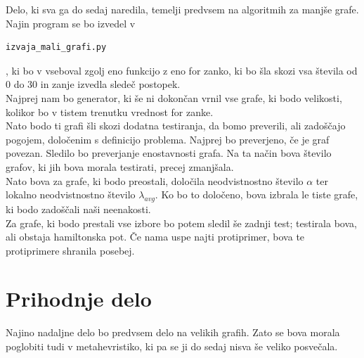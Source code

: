 \documentclass[12pt,a4paper]{amsart}
\begin{document}
Delo, ki sva ga do sedaj naredila, temelji predvsem na algoritmih za manjše grafe. Najin program se bo izvedel v \begin{verbatim}
izvaja_mali_grafi.py
\end{verbatim}, ki bo v vseboval zgolj eno funkcijo z eno for zanko, ki bo šla skozi vsa števila od 0 do 30 in zanje izvedla sledeč postopek.\\
Najprej nam bo generator, ki še ni dokončan vrnil vse grafe, ki bodo velikosti, kolikor bo v tistem trenutku vrednost for zanke.\\
 Nato bodo ti grafi šli skozi dodatna testiranja, da bomo preverili, ali zadoščajo pogojem, določenim s definicijo problema. Najprej bo preverjeno, če je graf povezan. Sledilo bo preverjanje enostavnosti grafa. Na ta način bova število grafov, ki jih bova morala testirati, precej zmanjšala. \\
 Nato bova za grafe, ki bodo preostali, določila neodvistnostno število $\alpha$ ter lokalno neodvistnostno število $\lambda_{avg}$. Ko bo to določeno, bova izbrala le tiste grafe, ki bodo zadoščali naši neenakosti. \\
 Za grafe, ki bodo prestali vse izbore bo potem sledil še zadnji test; testirala bova, ali obstaja hamiltonska pot. Če nama uspe najti protiprimer, bova te protiprimere shranila posebej.
\section{Prihodnje delo}
Najino nadaljne delo bo predvsem delo na velikih grafih. Zato se bova morala poglobiti tudi v metahevristiko, ki pa se ji do sedaj nisva še veliko posvečala.
\end{document}
